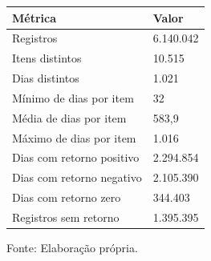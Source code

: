 \begingroup
\setlength{}
\setlength{}
\fontsize{12.0pt}{14.4pt}\selectfont

\setlength{\LTpost}{0mm}
\begin{longtable}{@{\extracolsep{\fill}}ll}

\toprule
\textbf{Métrica} & \textbf{Valor} \\ 
\midrule\addlinespace[2.5pt]
Registros & 6.140.042 \\
Itens distintos & 10.515 \\
Dias distintos & 1.021 \\
Mínimo de dias por item & 32 \\
Média de dias por item & 583,9 \\
Máximo de dias por item & 1.016 \\
Dias com retorno positivo & 2.294.854 \\
Dias com retorno negativo & 2.105.390 \\
Dias com retorno zero & 344.403 \\
Registros sem retorno & 1.395.395 \\
\bottomrule
\end{longtable}
\begin{minipage}{\linewidth}
Fonte: Elaboração própria.\\
\end{minipage}
\endgroup
